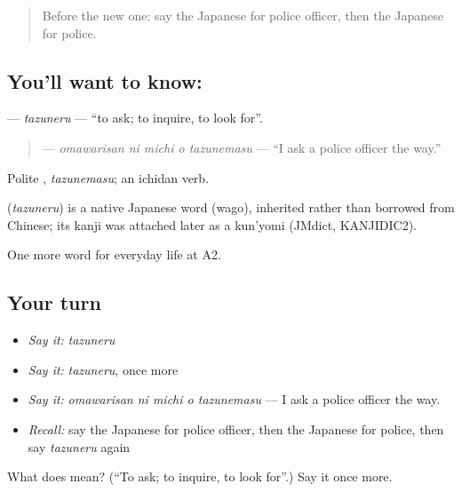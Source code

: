 \begin{quote}
Before the new one: say the Japanese for police officer, then the Japanese for police.
\end{quote}

\subsection*{You'll want to know: }
\textbf{} — \emph{tazuneru} — \textquotedblleft{}to ask; to inquire, to look for\textquotedblright{}.

\begin{quote}
\textbf{  } — \emph{omawarisan ni michi o tazunemasu} — \textquotedblleft{}I ask a police officer the way.\textquotedblright{}
\end{quote}

Polite \textbf{}, \emph{tazunemasu}; an ichidan verb.

\begin{cousinweb}
\textbf{} (\emph{tazuneru}) is a native Japanese word (wago), inherited rather than borrowed from Chinese; its kanji was attached later as a kun'yomi (JMdict, KANJIDIC2).
\end{cousinweb}

\begin{grammarlens}[title={What you've built}]
One more word for everyday life at A2.
\end{grammarlens}

\subsection*{Your turn}
\begin{itemize}
\raggedright
  \item \emph{Say it:} \emph{tazuneru}
  \item \emph{Say it:} \emph{tazuneru}, once more
  \item \emph{Say it:} \emph{omawarisan ni michi o tazunemasu} — I ask a police officer the way.
  \item \emph{Recall:} say the Japanese for police officer, then the Japanese for police, then say \emph{tazuneru} again
\end{itemize}

\begin{tcolorbox}[breakable,colback=teal!4,colframe=teal!35!black,title={Before you move on}]
What does  mean? (\textquotedblleft{}To ask; to inquire, to look for\textquotedblright{}.) Say it once more.
\end{tcolorbox}
